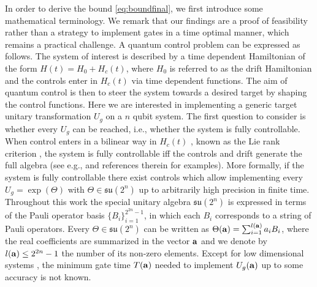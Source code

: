 \documentclass[aps,twocolumn,amsmath,amssymb,nofootinbib,superscriptaddress]{revtex4-1}
\begin{document}
In order to derive the bound \eqref{eq:boundfinal}, we first introduce some mathematical terminology. We remark that our findings are a proof of feasibility rather than a strategy to implement gates in a time optimal manner, which remains a practical challenge. A quantum control problem can be expressed as follows. The system of interest is described by a time dependent Hamiltonian of the form 
$H(t)=H_{0}+H_{c}(t)$,	
 where $H_{0}$ is referred to as the drift Hamiltonian and the controls enter in $H_{c}(t)$ via time dependent functions. The aim of quantum control is then to steer the system towards a desired target by shaping the control functions. Here we are interested in implementing a generic target unitary transformation $U_{g}$ on a $n$ qubit system. The first question to consider is whether every $U_{g}$ can be reached, i.e., whether the system is fully controllable. When control enters in a bilinear way in $H_{c}(t)$ \cite{Elliot}, known as the Lie rank criterion \cite{BookDalessandro}, the system is fully controllable iff the controls and drift generate the full algebra (see e.g., \cite{Carenzspinstar, LieAlExample1, LieAlExample2, SimilarModelC1, SimilarModelC2, Symmetries1, Symmetries2} and references therein for examples). More formally, if the system is fully controllable there exist controls which allow implementing every $U_{g}=\exp(\Theta)$ with $\Theta\in \mathfrak{su}(2^{n})$ up to arbitrarily high precision in finite time. Throughout this work the special unitary algebra $\mathfrak{su}(2^{n})$ is expressed in terms of the Pauli operator basis $\{B_{i}\}_{i=1}^{2^{2n}-1}$, in which each $B_{i}$ corresponds to a string of Pauli operators. Every $\Theta\in \mathfrak{su}(2^{n})$ can be written as $\Theta(\bold{a})=\sum_{i=1}^{l(\bold{a})}a_{i}B_{i}$, where the real coefficients are summarized in the vector $\bold{a}$ and we denote by $l(\bold{a})\leq 2^{2n}-1$ the number of its non-zero elements. Except for low dimensional systems \cite{OptimalControlSpeedLimit2, ExactCalc1, ExactCalc2, ExactCalc3, ExactCalc4, Nori}, the minimum gate time $T(\bold{a})$ needed to implement $U_{g}(\bold{a})$ up to some accuracy is not known.  
  
\end{document}
